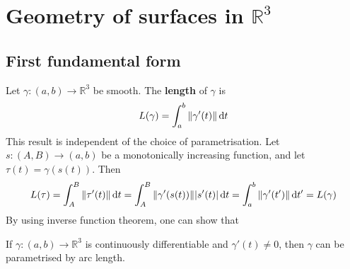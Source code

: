 \documentclass[a4paper,11pt]{article}
\begin{document}
\section{Geometry of surfaces in \( \mathbb R^3 \)}
\subsection{First fundamental form}

Let \( \gamma \colon (a,b) \to \mathbb R^3 \) be smooth.
The \textbf{length} of \( \gamma \) is
\[
	L(\gamma) = \int_a^b \norm{\gamma'(t)} \dd{t}
\]
This result is independent of the choice of parametrisation.
Let \( s \colon (A,B) \to (a,b) \) be a monotonically increasing function, and let \( \tau(t) = \gamma(s(t)) \).
Then
\[
	L(\tau) = \int_A^B \norm{\tau'(t)} \dd{t} = \int_A^B \norm{\gamma'(s(t))} \abs{s'(t)} \dd{t} = \int_a^b \norm{\gamma'(t')} \dd{t'} = L(\gamma)
\]
By using inverse function theorem, one can show that
\begin{lemma}
	If \( \gamma \colon (a,b) \to \mathbb R^3 \) is continuously differentiable and \( \gamma'(t) \neq 0 \), then \( \gamma \) can be parametrised by arc length.
\end{lemma} 
\end{document}
